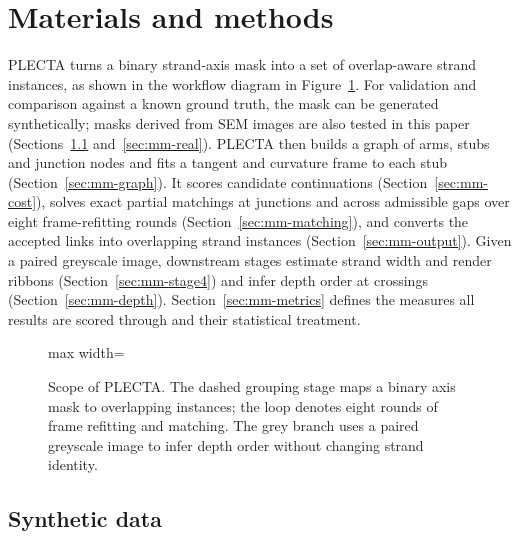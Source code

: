 \section{Materials and methods}
\label{sec:methods}

PLECTA turns a binary strand-axis mask into a set of overlap-aware strand
instances, as shown in the workflow diagram in Figure~\ref{fig:scope}. For
validation and comparison against a known ground truth, the mask can be
generated synthetically; masks derived from SEM images are also tested in this
paper (Sections~\ref{sec:mm-synth} and~\ref{sec:mm-real}). PLECTA then builds a graph
of arms, stubs and junction nodes and fits a tangent and curvature frame to
each stub (Section~\ref{sec:mm-graph}). It scores candidate continuations
(Section~\ref{sec:mm-cost}), solves exact partial matchings at junctions and
across admissible gaps over eight frame-refitting rounds
(Section~\ref{sec:mm-matching}), and converts the accepted links into
overlapping strand instances (Section~\ref{sec:mm-output}). Given a paired
greyscale image, downstream stages estimate strand width and render ribbons
(Section~\ref{sec:mm-stage4}) and infer depth order at crossings
(Section~\ref{sec:mm-depth}). Section~\ref{sec:mm-metrics} defines the
measures all results are scored through and their statistical treatment.

\begin{figure}[!ht]
    \centering
    \begin{adjustbox}{max width=\linewidth}{}\end{adjustbox}
    \caption{Scope of PLECTA. The dashed grouping stage maps a binary axis mask
    to overlapping instances; the loop denotes eight rounds of frame refitting
    and matching. The grey branch uses a paired greyscale image to infer depth
    order without changing strand identity.}
    \label{fig:scope}
\end{figure}

\subsection{Synthetic data}
\label{sec:mm-synth}

